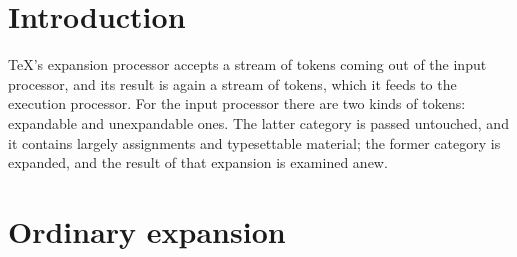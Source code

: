 \documentclass[letterpaper]{book}
\begin{document}
\section{Introduction}

\TeX's expansion processor accepts a stream of tokens
coming out of the input processor, and its result is
again a stream of tokens, which it feeds to the execution
processor. For the input processor there are two
kinds of tokens: expandable and unexpandable ones.
The latter category is passed untouched, and it contains
largely assignments and typesettable material;
the former category
is expanded, and the result of that expansion is examined anew.

\section{Ordinary expansion}
\end{document}
